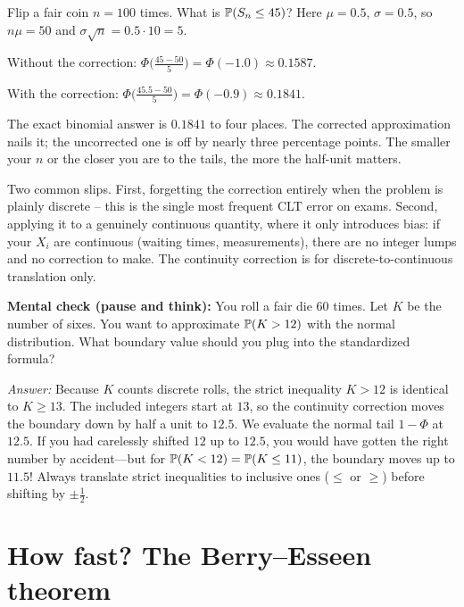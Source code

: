 \begin{example}
\label{ch21:ex-cc}
Flip a fair coin $n = 100$ times. What is $\P(S_n \le 45)$? Here $\mu = 0.5$,
$\sigma = 0.5$, so $n\mu = 50$ and $\sigma\sqrt n = 0.5 \cdot 10 = 5$.

Without the correction:
$\Phi\!\big(\frac{45 - 50}{5}\big) = \Phi(-1.0) \approx 0.1587$.

With the correction:
$\Phi\!\big(\frac{45.5 - 50}{5}\big) = \Phi(-0.9) \approx 0.1841$.

The exact binomial answer is $0.1841$ to four places. The corrected approximation nails
it; the uncorrected one is off by nearly three percentage points. The smaller your $n$
or the closer you are to the tails, the more the half-unit matters.
\end{example}

\begin{trapbox}
Two common slips. First, forgetting the correction entirely when the problem is plainly
discrete -- this is the single most frequent CLT error on exams. Second, applying it to
a genuinely continuous quantity, where it only introduces bias: if your $X_i$ are
continuous (waiting times, measurements), there are no integer lumps and no correction
to make. The continuity correction is for discrete-to-continuous translation only.
\end{trapbox}

\begin{recoverybox}
\textbf{Mental check (pause and think):} You roll a fair die $60$ times. Let $K$ be the number of sixes. You want to approximate $\P(K > 12)$ with the normal distribution. What boundary value should you plug into the standardized formula?

\emph{Answer:} Because $K$ counts discrete rolls, the strict inequality $K > 12$ is identical to $K \ge 13$. The included integers start at $13$, so the continuity correction moves the boundary down by half a unit to $12.5$. We evaluate the normal tail $1 - \Phi$ at $12.5$. If you had carelessly shifted $12$ up to $12.5$, you would have gotten the right number by accident---but for $\P(K < 12) = \P(K \le 11)$, the boundary moves up to $11.5$! Always translate strict inequalities to inclusive ones ($\le$ or $\ge$) before shifting by $\pm \frac12$.
\end{recoverybox}

\section{How fast? The Berry--Esseen theorem}
\label{ch21:berry-esseen}

